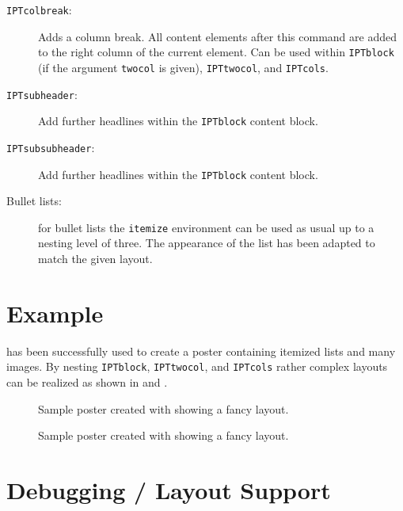 \begin{description}
	\item[\texttt{\bs{}IPTcolbreak}:] Adds a column break. All content elements after this command are added to the right column of the current element. Can be used within \texttt{IPTblock} (if the argument \texttt{twocol} is given), \texttt{IPTtwocol}, and \texttt{IPTcols}.

	\item[\texttt{\bs{}IPTsubheader}:] Add further headlines within the \texttt{\bs{}IPTblock} content block.

	\item[\texttt{\bs{}IPTsubsubheader}:] Add further headlines within the \texttt{\bs{}IPTblock} content block.

	\item[Bullet lists:] for bullet lists the \texttt{itemize} environment can be used as usual up to a nesting level of three. The appearance of the list has been adapted to match the given layout.
\end{description}

\section{Example}

\tugPoster has been successfully used to create a poster containing itemized lists and many images. By nesting \texttt{IPTblock}, \texttt{IPTtwocol}, and \texttt{IPTcols} rather complex layouts can be realized as shown in  and .

\begin{figure}
\centering
\caption{Sample poster created with \tugPoster showing a fancy layout.}
\label{fig:sample_poster1}
\end{figure}

\begin{figure}
\centering
\caption{Sample poster created with \tugPoster showing a fancy layout.}
\label{fig:sample_poster2}
\end{figure}

\section{Debugging / Layout Support}
\label{sec:debugging}


